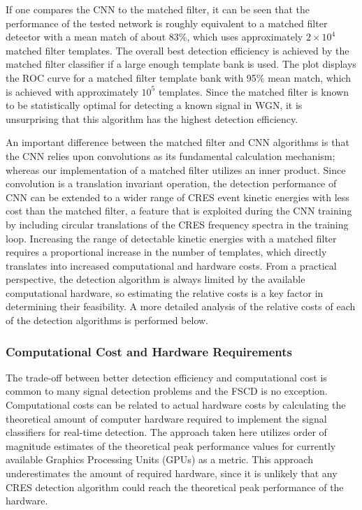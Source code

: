 If one compares the CNN to the matched filter, it can be seen that the performance of the tested network is roughly equivalent to a matched filter detector with a mean match of about 83\%, which uses approximately $2\times10^4$ matched filter templates. The overall best detection efficiency is achieved by the matched filter classifier if a large enough template bank is used. The plot displays the ROC curve for a matched filter template bank with 95\% mean match, which is achieved with approximately $10^5$ templates. Since the matched filter is known to be statistically optimal for detecting a known signal in WGN, it is unsurprising that this algorithm has the highest detection efficiency.

An important difference between the matched filter and CNN algorithms is that the CNN relies upon convolutions as its fundamental calculation mechanism; whereas our implementation of a matched filter utilizes an inner product. Since convolution is a translation invariant operation, the detection performance of CNN can be extended to a wider range of CRES event kinetic energies with less cost than the matched filter, a feature that is exploited during the CNN training by including circular translations of the CRES frequency spectra in the training loop. Increasing the range of detectable kinetic energies with a matched filter requires a proportional increase in the number of templates, which directly translates into increased computational and hardware costs. From a practical perspective, the detection algorithm is always limited by the available computational hardware, so estimating the relative costs is a key factor in determining their feasibility. A more detailed analysis of the relative costs of each of the detection algorithms is performed below.


\subsubsection{Computational Cost and Hardware Requirements}
\label{sec:dis-comp-cost}


The trade-off between better detection efficiency and computational cost is common to many signal detection problems and the FSCD is no exception. Computational costs can be related to actual hardware costs by calculating the theoretical amount of computer hardware required to implement the signal classifiers for real-time detection. The approach taken here utilizes order of magnitude estimates of the theoretical peak performance values for currently available Graphics Processing Units (GPUs) as a metric. This approach underestimates the amount of required hardware, since it is unlikely that any CRES detection algorithm could reach the theoretical peak performance of the hardware. 

